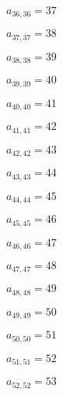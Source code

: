 \documentclass[a4paper,12pt]{article}
\begin{document}
$a _{ 36, 36 } = 37$

$a _{ 37, 37 } = 38$

$a _{ 38, 38 } = 39$

$a _{ 39, 39 } = 40$

$a _{ 40, 40 } = 41$

$a _{ 41, 41 } = 42$

$a _{ 42, 42 } = 43$

$a _{ 43, 43 } = 44$

$a _{ 44, 44 } = 45$

$a _{ 45, 45 } = 46$

$a _{ 46, 46 } = 47$

$a _{ 47, 47 } = 48$

$a _{ 48, 48 } = 49$

$a _{ 49, 49 } = 50$

$a _{ 50, 50 } = 51$

$a _{ 51, 51 } = 52$

$a _{ 52, 52 } = 53$
\end{document}
